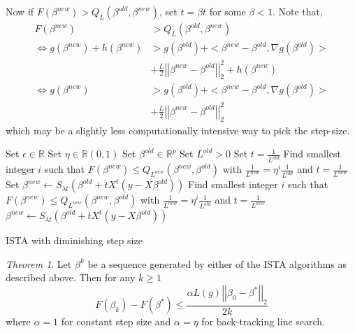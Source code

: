 \documentclass[12pt, leqno]{article}
\newcommand{\norm}[1]{\left|\left|#1\right|\right|}
\theoremstyle{remark}
\newtheorem{thm}{Theorem}
\begin{document}
Now if $F(\beta^{new}) > Q_L(\beta^{old},\beta^{new})$, set $t = \beta t$ for some $\beta <1$. Note that,
\begin{align*}
F(\beta^{new}) &> Q_L(\beta^{old},\beta^{new}) \\
\iff g(\beta^{new}) + h(\beta^{new}) &> g(\beta^{old}) + <\beta^{new} - \beta^{old}, \nabla g (\beta^{old})> \\ &+ \frac{L}{2} \norm{\beta^{new}-\beta^{old}}_2^2 + h(\beta^{new}) \\
\iff g(\beta^{new}) &> g(\beta^{old}) + <\beta^{new} - \beta^{old}, \nabla g (\beta^{old})>\\ 
&+ \frac{L}{2} \norm{\beta^{new}-\beta^{old}}_2^2 
\end{align*}
which may be a slightly less computationally intensive way to pick the step-size.

\begin{algorithm}[H]
\begin{algorithmic}
\State Set $\epsilon \in \mathbb{R}$
\State Set $\eta \in \mathbb{R}(0,1)$
\State Set $\beta^{old} \in \mathbb{R}^p$
\State Set $L^{old} > 0$
\State Set $t = \frac{1}{L^{old}}$
\State Find smallest integer $i$ such that $F(\beta^{new}) \leq Q_{L^{new}}(\beta^{new},\beta^{old})$ with $\frac{1}{L^{new}} = \eta^i \frac{1}{L^{old}}$ and $t = \frac{1}{L^{new}}$
\State Set $\beta^{new} \gets S_{\lambda t} (\beta^{old} + t X^t (y -
X \beta^{old}))$
\While {$\norm{\beta^{new} - \beta^{old}}_{\infty} \geq \epsilon$}
\State Find smallest integer $i$ such that $F(\beta^{new}) \leq Q_{L^{new}}(\beta^{new},\beta^{old})$ with $\frac{1}{L^{new}} = \eta^i \frac{1}{L^{old}}$ and $t = \frac{1}{L^{new}}$
   \State $\beta^{new} \gets S_{\lambda t} (\beta^{old} + t X^t (y -
X \beta^{old}))$
    \EndWhile
\end{algorithmic}
\caption{ISTA with diminishing step size}
\end{algorithm}

\begin{thm}
Let $\beta^k$ be a sequence generated by either of the ISTA algorithms as described above. Then for any $k\geq 1$
$$
F(\beta_k) - F(\beta^*) \leq \frac{\alpha L(g) \norm{\beta_0 - \beta^*}_2}{2k}
$$
where $\alpha = 1$ for constant step size and $\alpha = \eta$ for back-tracking line search.
\end{thm}
\end{document}
